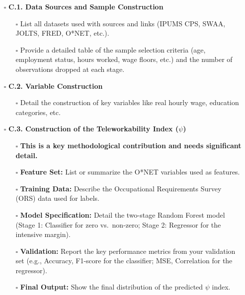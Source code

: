 \documentclass[
  11pt,
  letterpaper,
  DIV=11,
  numbers=noendperiod]{scrartcl}
\providecommand{\tightlist}{%
  \setlength{\itemsep}{0pt}\setlength{\parskip}{0pt}}\usepackage{longtable,booktabs,array}
\begin{document}
\begin{itemize}
\tightlist
\item[$\square$]
  \textbf{C.1. Data Sources and Sample Construction}

  \begin{itemize}
  \tightlist
  \item[$\square$]
    List all datasets used with sources and links (IPUMS CPS, SWAA,
    JOLTS, FRED, O*NET, etc.).
  \item[$\square$]
    Provide a detailed table of the sample selection criteria (age,
    employment status, hours worked, wage floors, etc.) and the number
    of observations dropped at each stage.
  \end{itemize}
\item[$\square$]
  \textbf{C.2. Variable Construction}

  \begin{itemize}
  \tightlist
  \item[$\square$]
    Detail the construction of key variables like real hourly wage,
    education categories, etc.
  \end{itemize}
\item[$\square$]
  \textbf{C.3. Construction of the Teleworkability Index (\(\psi\))}

  \begin{itemize}
  \tightlist
  \item[$\square$]
    \textbf{This is a key methodological contribution and needs
    significant detail.}
  \item[$\square$]
    \textbf{Feature Set:} List or summarize the O*NET variables used as
    features.
  \item[$\square$]
    \textbf{Training Data:} Describe the Occupational Requirements
    Survey (ORS) data used for labels.
  \item[$\square$]
    \textbf{Model Specification:} Detail the two-stage Random Forest
    model (Stage 1: Classifier for zero vs.~non-zero; Stage 2: Regressor
    for the intensive margin).
  \item[$\square$]
    \textbf{Validation:} Report the key performance metrics from your
    validation set (e.g., Accuracy, F1-score for the classifier; MSE,
    Correlation for the regressor).
  \item[$\square$]
    \textbf{Final Output:} Show the final distribution of the predicted
    \(\psi\) index.
  \end{itemize}
\end{itemize}
\end{document}
